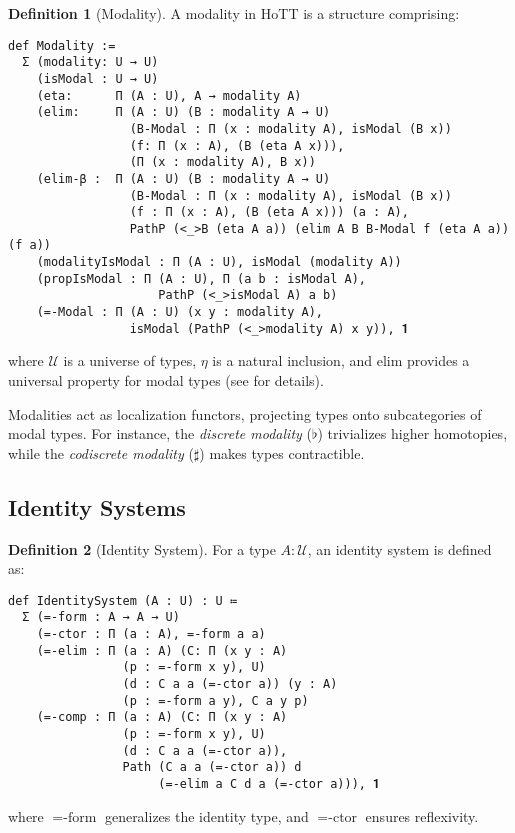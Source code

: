 \documentclass[12pt]{article}
\theoremstyle{definition}
\newtheorem{definition}{Definition}
\theoremstyle{plain}
\begin{document}
\begin{definition}[Modality]
A modality in HoTT is a structure comprising:
\begin{lstlisting}[mathescape=true]
def Modality :=
  Σ (modality: U → U)
    (isModal : U → U)
    (eta:      Π (A : U), A → modality A)
    (elim:     Π (A : U) (B : modality A → U)
                 (B-Modal : Π (x : modality A), isModal (B x))
                 (f: П (x : A), (B (eta A x))),
                 (Π (x : modality A), B x))
    (elim-β :  Π (A : U) (B : modality A → U)
                 (B-Modal : Π (x : modality A), isModal (B x))
                 (f : Π (x : A), (B (eta A x))) (a : A),
                 PathP (<_>B (eta A a)) (elim A B B-Modal f (eta A a)) (f a))
    (modalityIsModal : Π (A : U), isModal (modality A))
    (propIsModal : Π (A : U), Π (a b : isModal A),
                     PathP (<_>isModal A) a b)
    (=-Modal : Π (A : U) (x y : modality A),
                 isModal (PathP (<_>modality A) x y)), 𝟏
\end{lstlisting}
where $\mathcal{U}$ is a universe of types, $\eta$ is a natural inclusion, and $\text{elim}$ provides a universal property for modal types (see \cite{shulman2018modal} for details).
\end{definition}

Modalities act as localization functors, projecting types onto subcategories of modal types. For instance, the \emph{discrete modality} ($\flat$) trivializes higher homotopies, while the \emph{codiscrete modality} ($\sharp$) makes types contractible.

\subsection{Identity Systems}

\begin{definition}[Identity System]
For a type $A: \mathcal{U}$, an identity system is defined as:
\begin{lstlisting}[mathescape=true]
def IdentitySystem (A : U) : U ≔
  Σ (=-form : A → A → U)
    (=-ctor : Π (a : A), =-form a a)
    (=-elim : Π (a : A) (C: Π (x y : A)
                (p : =-form x y), U)
                (d : C a a (=-ctor a)) (y : A)
                (p : =-form a y), C a y p)
    (=-comp : Π (a : A) (C: Π (x y : A)
                (p : =-form x y), U)
                (d : C a a (=-ctor a)),
                Path (C a a (=-ctor a)) d
                     (=-elim a C d a (=-ctor a))), 𝟏
\end{lstlisting}
where $=\text{-form}$ generalizes the identity type, and $=\text{-ctor}$ ensures reflexivity.
\end{definition}
\end{document}
